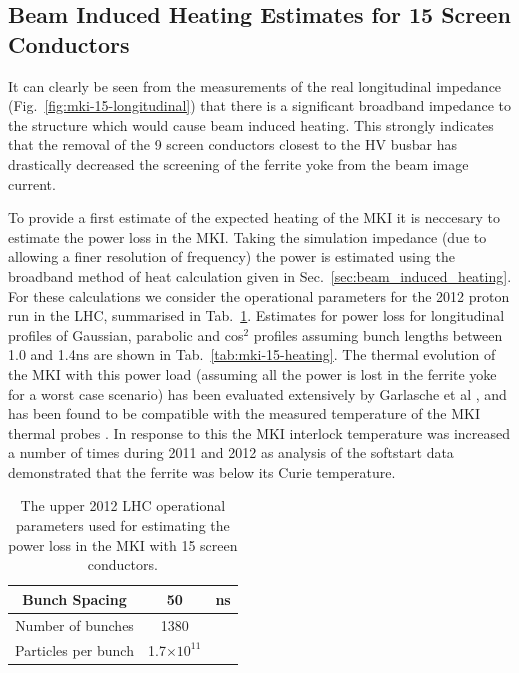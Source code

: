\subsection{Beam Induced Heating Estimates for 15 Screen Conductors}

It can clearly be seen from the measurements of the real longitudinal impedance (Fig.~\ref{fig:mki-15-longitudinal}) that there is a significant broadband impedance to the structure which would cause beam induced heating. This strongly indicates that the removal of the 9 screen conductors closest to the HV busbar has drastically decreased the screening of the ferrite yoke from the beam image current.

To provide a first estimate of the expected heating of the MKI it is neccesary to estimate the power loss in the MKI. Taking the simulation impedance (due to allowing a finer resolution of frequency) the power is estimated using the broadband method of heat calculation given in Sec.~\ref{sec:beam_induced_heating}. For these calculations we consider the operational parameters for the 2012 proton run in the LHC, summarised in Tab.~\ref{tab:mki-beam-parameters}. Estimates for power loss for longitudinal profiles of Gaussian, parabolic and cos$^{2}$ profiles assuming bunch lengths between 1.0 and 1.4ns are shown in Tab.~\ref{tab:mki-15-heating}. The thermal evolution of the MKI with this power load (assuming all the power is lost in the ferrite yoke for a worst case scenario) has been evaluated extensively by Garlasche et al \cite{Garlasche:2dHeat}, and has been found to be compatible with the measured temperature of the MKI thermal probes \cite{Barnes:mkiHeating}. In response to this the MKI interlock temperature was increased a number of times during 2011 and 2012 as analysis of the softstart data demonstrated that the ferrite was below its Curie temperature.

\begin{table}
\caption{The upper 2012 LHC operational parameters used for estimating the power loss in the MKI with 15 screen conductors.}
\label{tab:mki-beam-parameters}
\begin{center}
\begin{tabular}{c | c | c}
Bunch Spacing & 50 & ns \\ \hline
Number of bunches & 1380 & \\ \hline
Particles per bunch & 1.7$\times 10^{11}$ & \\
\end{tabular}
\end{center}
\end{table}

